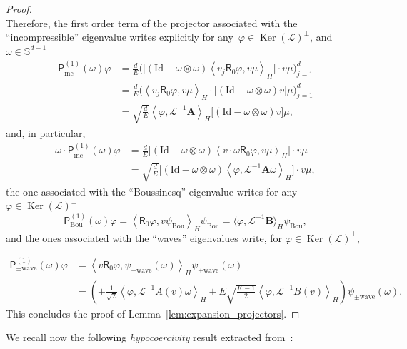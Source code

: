 \documentclass[10pt]{amsart}
\theoremstyle{definition}\newtheorem{defi}[theo]{Definition}\newtheorem{rema}[theo]{Remark}\newtheorem{exam}[theo]{Example}\newtheorem{exem}[theo]{Example}\newtheorem{nota}[theo]{Notation}
\DeclareMathOperator{\nul}{Ker}
\newcommand{\Id}{\mathrm{Id}}
\newcommand{\Wave}{\mathrm{wave}}
\newcommand{\Inc}{\mathrm{inc}}
\newcommand{\Bou}{\mathrm{Bou}}
\newcommand{\sfR}{\mathsf{R}}
\newcommand{\BurA}{{\mathbf{A}}}
\newcommand{\BurB}{{\mathbf{B}}}
\renewcommand{\S}{\mathbb{S}}
\newcommand{\LL}{\mathcal{L}}
\newcommand{\PP}{\mathsf{P}}
\newcommand{\Ss}{H}
\newcommand{\la}{\langle}
\newcommand{\ra}{\rangle}
\begin{document}
\begin{proof}
\[\]
Therefore, the first order term of the projector associated with the ``incompressible'' eigenvalue writes explicitly for any~$\varphi\in \nul(\LL)^{\perp}$, and $\omega \in \S^{d-1}$
\begin{align*}
\PP^{(1)}_\Inc(\omega) \varphi & = \frac{d}{E} \Bigg(\Big[\left(\Id - \omega \otimes \omega \right) \left\la v_j \sfR_0 \varphi, v \mu \right\ra_{\Ss} \Big] \cdot v \mu \Bigg)_{j=1}^d \\
&= \frac{d}{E} \Bigg(\left\la v_j \sfR_0 \varphi, v \mu \right\ra_{\Ss} \cdot \Big[\left(\Id - \omega \otimes \omega \right) v \Big] \mu \Bigg)_{j=1}^d \\
& = \sqrt{\frac{d}{E}} \left\la \varphi, \LL^{-1}\BurA \right\ra_{\Ss} \Big[\left(\Id - \omega \otimes \omega \right) v \Big] \mu,
\end{align*}
and, in particular,
\begin{align*}
\omega \cdot \PP^{(1)}_\Inc(\omega) \varphi & = \frac{d}{E} \Big[\left(\Id - \omega \otimes \omega \right) \left\la v \cdot \omega \sfR_0 \varphi, v \mu \right\ra_{\Ss} \Big] \cdot v \mu \\
& = \sqrt{\frac{d}{E}} \Big[\left(\Id - \omega \otimes \omega \right) \left\la \varphi, \LL^{-1}\BurA \omega \right\ra_{\Ss} \Big] \cdot v \mu,
\end{align*}
the one associated with the ``Boussinesq'' eigenvalue writes for any $\varphi \in \nul(\LL)^\perp$
\[
\PP^{(1)}_\Bou(\omega) \varphi = \left \langle \sfR_{0} \varphi, v \psi_\Bou \right \rangle_{\Ss} \psi_\Bou= \langle \varphi, \LL^{-1} \BurB \rangle_{\Ss} \psi_\Bou,
\]
and the ones associated with the ``waves'' eigenvalues write, for $\varphi\in \nul(\LL)^{\perp}$,

\break
\begin{align*}
\PP^{(1)}_{\pm \Wave}(\omega) \varphi&= \left \langle v \sfR_{0} \varphi, \psi_{\pm \Wave}(\omega) \right \rangle_{\Ss} \psi_{\pm \Wave}(\omega)\\
&= \left(\pm \frac{1}{\sqrt{2} } \left\langle \varphi, \LL^{-1} A(v) \omega \right\rangle_{\Ss} + E \sqrt{\frac{K-1}{2}} \left\langle \varphi, \LL^{-1} B(v) \right\rangle_{\Ss} \right) \psi_{\pm \Wave}(\omega).
\end{align*}
This concludes the proof of Lemma~\ref{lem:expansion_projectors}.
\end{proof}

We recall now the following \emph{hypocoercivity} result extracted from~\cite{D2011}:
\end{document}
